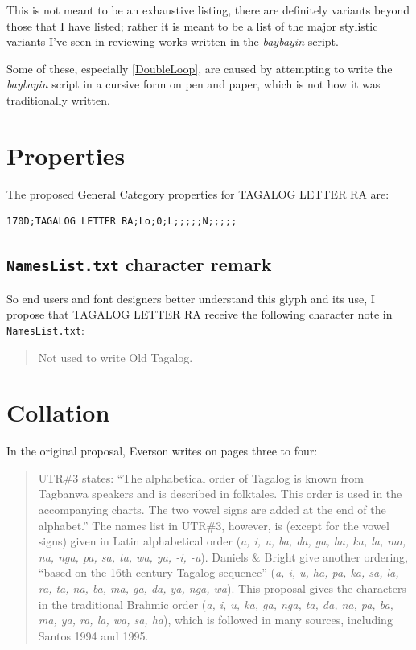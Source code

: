 \documentclass[a4paper,pagesize,openany,14pt,parskip=never]{scrbook}
\newcommand{\≈}{$\approx$}
\begin{document}
This is not meant to be an exhaustive listing, there are definitely variants beyond those that I have listed; rather it is meant to be a list of the major stylistic variants I've seen in reviewing works written in the {\em baybayin} script.

Some of these, especially \textnumero\ref{DoubleLoop}, are caused by attempting to write the {\em baybayin} script in a cursive form on pen and paper, which is not how it was traditionally written.

\section{Properties}
The proposed General Category properties for \textsf{TAGALOG LETTER RA} are:

\begin{verbatim}
170D;TAGALOG LETTER RA;Lo;0;L;;;;;N;;;;;
\end{verbatim}

\subsection{\texttt{NamesList.txt} character remark}

So end users and font designers better understand this glyph and its use, I propose that \textsf{TAGALOG LETTER RA} receive the following character note in \texttt{NamesList.txt}:

\begin{quote}
    Not used to write Old Tagalog.
\end{quote}

\section{Collation}

In the original proposal, Everson writes on pages three to four:

\begin{quote}
    UTR\#3 states: “The alphabetical order of Tagalog is known from Tagbanwa speakers and is described in folktales. This order is used in the accompanying charts. The two vowel signs are added at the end of the alphabet.” The names list in UTR\#3, however, is (except for the vowel signs) given in Latin alphabetical order ({\em a, i, u, ba, da, ga, ha, ka, la, ma, na, nga, pa, sa, ta, wa, ya, -i, -u}). Daniels \& Bright give another ordering, “based on the 16th-century Tagalog sequence” ({\em a, i, u, ha, pa, ka, sa, la, ra, ta, na, ba, ma, ga, da, ya, nga, wa}). This proposal gives the characters in the traditional Brahmic order ({\em a, i, u, ka, ga, nga, ta, da, na, pa, ba, ma, ya, ra, la, wa, sa, ha}), which is followed in many sources, including Santos 1994 and 1995.
\end{quote}
\end{document}
